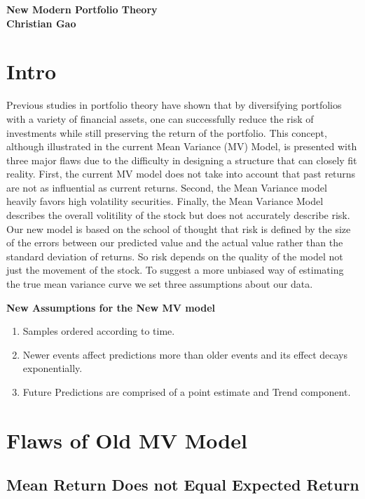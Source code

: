 \documentclass[english]{report}
\begin{document}



\begin{center}\bf\Large
New Modern Portfolio Theory\\ \normalfont
Christian Gao
\end{center}
\tableofcontents
\newpage


\section{Intro}

\Large{Previous studies in portfolio theory have shown that by diversifying portfolios with a variety of financial assets, one can successfully reduce the risk of investments while still preserving the return of the portfolio. This concept, although illustrated in the current Mean Variance (MV) Model, is presented with three major flaws due to the difficulty in designing a structure that can closely fit reality. First, the current MV model does not take into account that past returns are not as influential as current returns. Second, the Mean Variance model heavily favors high volatility securities. Finally, the Mean Variance Model describes the overall volitility of the stock but does not accurately describe risk. Our new model is based on the school of thought that risk is defined by the size of the errors between our predicted value and the actual value rather than the standard deviation of returns. So risk depends on the quality of the model not just the movement of the stock. To suggest a more unbiased way of estimating the true mean variance curve we set three assumptions about our data.
}

\Large{\bf New Assumptions for the New MV model}

\begin{enumerate}
  \item Samples ordered according to time.
  \item Newer events affect predictions more than older events and its effect decays exponentially.
  \item Future Predictions are comprised of a point estimate and Trend component.
\end{enumerate}

\newpage
\section{Flaws of Old MV Model}

\subsection{Mean Return Does not Equal Expected Return}
\end{document}

